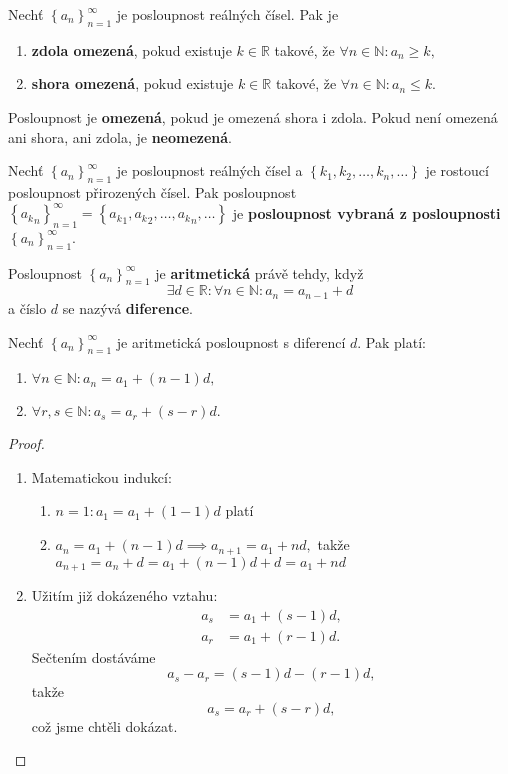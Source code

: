 \begin{definition}
    Nechť $\left \{ a_n \right \}_{n=1}^\infty $ je posloupnost reálných čísel. Pak je
    \begin{enumerate}[$i.$]
    \item \textbf{zdola omezená}, pokud existuje $k\in \mathbb R$ takové, že
    $\forall n \in \mathbb N: a_n \geq k,$
   	\item \textbf{shora omezená}, pokud existuje $k\in \mathbb R$ takové, že
    $\forall n \in \mathbb N: a_n \leq k.$
    \end{enumerate}
    Posloupnost je \textbf{omezená}, pokud je omezená shora i zdola.
    Pokud není omezená ani shora, ani zdola, je \textbf{neomezená}.
\end{definition}

\begin{definition}
Nechť $\left \{ a_n \right \}_{n=1}^\infty $ je posloupnost reálných čísel a
$\left \{ k_1,k_2,\dots,k_n,\dots \right \} $ je rostoucí posloupnost přirozených čísel.
Pak posloupnost $\left \{{a_k}_n \right \}_{n=1}^\infty = \left \{ {a_k}_1, {a_k}_2, \dots, {a_k}_n,\dots \right \}  $
je \textbf{posloupnost vybraná z posloupnosti} $\left \{ a_n \right \}_{n=1}^\infty $.
\end{definition}

\begin{definition}
Posloupnost $\left \{ a_n \right \}_{n=1}^\infty $ je \textbf{aritmetická} právě
tehdy, když
$$\exists d \in \mathbb R: \forall n \in \mathbb N: a_n=a_{n-1}+d$$
a číslo $d$ se nazývá \textbf{diference}.
\end{definition}

\begin{veta}
    Nechť $\left \{ a_n \right \}_{n=1}^\infty $ je aritmetická posloupnost s diferencí
    $d$. Pak platí:
    \begin{enumerate}[$i.$]
    \item $\forall n\in \mathbb N: a_n = a_1 + (n-1)d,$
   	\item $\forall r,s \in \mathbb N: a_s = a_r + (s-r)d.$
    \end{enumerate}
\end{veta}

\begin{proof}\,
\begin{enumerate}[$i.$]
\item Matematickou indukcí:
\begin{enumerate}[1.]
\item $n=1: a_1 = a_1+(1-1)d$ platí
\item $a_n = a_1+(n-1)d \implies a_{n+1}=a_1+nd,$ takže $a_{n+1}=a_n+d=a_1+(n-1)d+d=a_1+nd$
\end{enumerate}
\item Užitím již dokázeného vztahu:
\begin{align*}
    a_s &= a_1 + (s-1)d,\\
    a_r &= a_1 + (r-1)d.
\end{align*}
Sečtením dostáváme
$$a_s-a_r = (s-1)d-(r-1)d,$$
takže
$$a_s=a_r+(s-r)d,$$
což jsme chtěli dokázat.\qedhere
\end{enumerate}
\end{proof}

